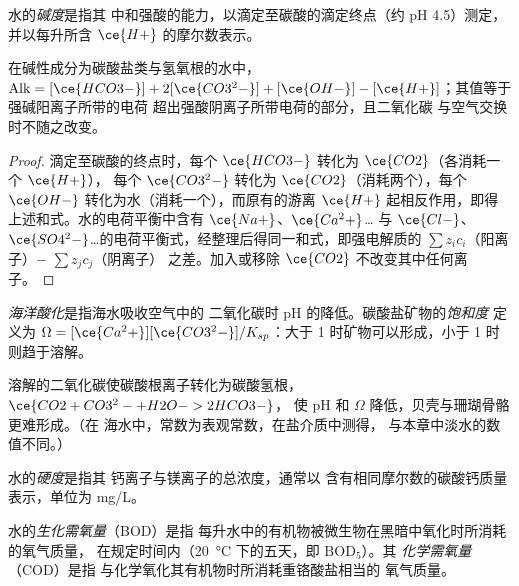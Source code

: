 \begin{definition}[碱度]\label{def:b3:environmental-toxicology:alkalinity}
水的\emph{碱度}是指其
中和强酸的能力，以滴定至碳酸的滴定终点（约 pH
4.5）测定，并以每升所含 $\ce{H+}$ 的摩尔数表示。
\end{definition}

\begin{proposition}[碳酸盐碱度]\label{prop:b3:environmental-toxicology:alkalinity}
在碱性成分为碳酸盐类与氢氧根的水中，
$\mathrm{Alk} = [\ce{HCO3-}] + 2[\ce{CO3^2-}] + [\ce{OH-}] - [\ce{H+}]$；其值等于强碱阳离子所带的电荷
超出强酸阴离子所带电荷的部分，且二氧化碳
与空气交换时不随之改变。
\end{proposition}

\begin{proof}
滴定至碳酸的终点时，每个 $\ce{HCO3-}$ 转化为 $\ce{CO2}$（各消耗一个 $\ce{H+}$），
每个 $\ce{CO3^2-}$ 转化为 $\ce{CO2}$（消耗两个），每个 $\ce{OH-}$ 转化为水（消耗一个），而原有的游离 $\ce{H+}$
起相反作用，即得上述和式。水的电荷平衡中含有
$\ce{Na+}$、$\ce{Ca^2+}$\dots{} 与 $\ce{Cl-}$、$\ce{SO4^2-}$\dots 的电荷平衡式，经整理后得同一和式，即强电解质的 $\sum z_i c_i$（阳离子）$-$ $\sum z_jc_j$（阴离子）
之差。加入或移除 $\ce{CO2}$ 不改变其中任何离子。
\end{proof}

\begin{definition}[海洋酸化]\label{def:b3:environmental-toxicology:acidification}
\emph{海洋酸化}是指海水吸收空气中的
二氧化碳时 pH 的降低。碳酸盐矿物的\emph{饱和度}
定义为
$\Omega = [\ce{Ca^2+}][\ce{CO3^2-}]/K_{sp}$：大于 1 时矿物可以形成，小于 1 时则趋于溶解。
\end{definition}

溶解的二氧化碳使碳酸根离子转化为碳酸氢根，$\ce{CO2 + CO3^2- + H2O -> 2HCO3-}$，
使 pH 和 $\Omega$ 降低，贝壳与珊瑚骨骼更难形成。（在
海水中，常数为表观常数，在盐介质中测得，
与本章中淡水的数值不同。）

\begin{definition}[水的硬度]\label{def:b3:environmental-toxicology:hardness}
水的\emph{硬度}是指其
钙离子与镁离子的总浓度，通常以
含有相同摩尔数的碳酸钙质量表示，单位为 mg/L。
\end{definition}

\begin{definition}[需氧量]\label{def:b3:environmental-toxicology:oxygen-demand}
水的\emph{生化需氧量}（BOD）是指
每升水中的有机物被微生物在黑暗中氧化时所消耗的氧气质量，
在规定时间内（\qty{20}{\celsius} 下的五天，即 $\mathrm{BOD_5}$）。其
\emph{化学需氧量}（COD）是指
与化学氧化其有机物时所消耗重铬酸盐相当的
氧气质量。
\end{definition}

